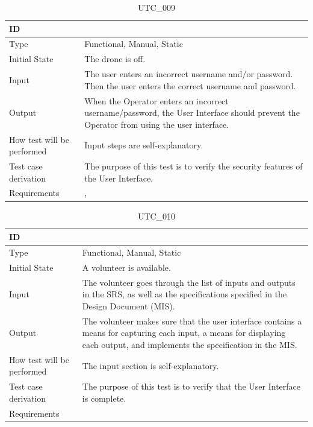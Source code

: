 \documentclass[12pt, titlepage]{article}
\begin{document}
\begin{table}[!h]
\begin{center}
\caption {UTC\_009}
\label{tab:UTC_009}
\begin{tabular}{ | m{3.2cm} | m{12.2cm} | } 
\hline
ID & \nameref{tab:UTC_009} \\ 
\hline
Type &  Functional, Manual, Static  \\ 
\hline
Initial State &  The drone is off. \\ 
\hline
Input &  The user enters an incorrect username and/or password. Then the user enters the correct username and password. \\ 
\hline
Output &  When the Operator enters an incorrect username/password, the User Interface should prevent the Operator from using the user interface. \\ 
\hline
How test will be performed & Input steps are self-explanatory. \\ 
\hline
Test case derivation & The purpose of this test is to verify the security features of the User Interface. \\
\hline
Requirements & \nameref{SR_013}, \nameref{SEC_001} \\ 
\hline
\end{tabular}
\end{center}
\end{table}


\begin{table}[!h]
\begin{center}
\caption {UTC\_010}
\label{tab:UTC_010}
\begin{tabular}{ | m{3.2cm} | m{12.2cm} | } 
\hline
ID & \nameref{tab:UTC_010} \\ 
\hline
Type &  Functional, Manual, Static  \\ 
\hline
Initial State & A volunteer is available.\\ 
\hline
Input &  The volunteer goes through the list of inputs and outputs in the SRS, as well as the specifications specified in the Design Document (MIS). \\ 
\hline
Output &  The volunteer makes sure that the user interface contains a means for capturing each input, a means for displaying each output, and implements the specification in the MIS. \\ 
\hline
How test will be performed & The input section is self-explanatory. \\ 
\hline
Test case derivation & The purpose of this test is to verify that the User Interface is complete. \\ 
\hline
Requirements &  \\ 
\hline
\end{tabular}
\end{center}
\end{table}
\end{document}
